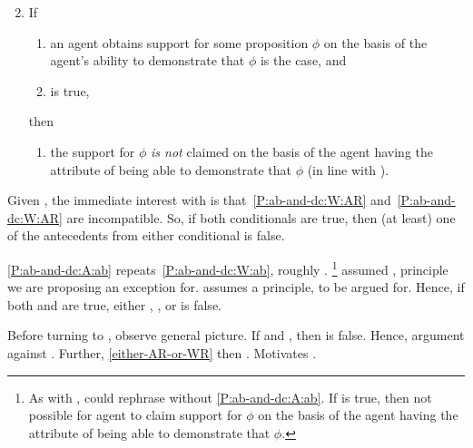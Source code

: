 \begin{note}[Conditional B]
  \begin{proposition}[\mcB{}]
    \begin{enumerate}[label=(C\Alph*), ref=(C\Alph*)]
      \setcounter{enumi}{1}
    \item\label{P:ab-and-dc:A} If
      \begin{enumerate}[label=(\roman*), ref=(CB.\roman*)]
      \item\label{P:ab-and-dc:A:ab} an agent obtains support for some proposition \(\phi\) on the basis of the agent's ability to demonstrate that \(\phi\) is the case, and
      \item\label{P:ab-and-dc:A:ni} \nI{} is true,
      \end{enumerate}
      then
      \begin{enumerate}[label=(\roman*), ref=(CB.\roman*), resume]
      \item\label{P:ab-and-dc:A:AR} the support for \(\phi\) \emph{is not} claimed on the basis of the agent having the attribute of being able to demonstrate that \(\phi\) (in line with \AR{}).
      \end{enumerate}
    \end{enumerate}
  \end{proposition}

  Given \mcA{}, the immediate interest with \mcB{} is that~\ref{P:ab-and-dc:W:AR} and~\ref{P:ab-and-dc:W:AR} are incompatible.
  So, if both conditionals are true, then (at least) one of the antecedents from either conditional is false.

  \ref{P:ab-and-dc:A:ab} repeats~\ref{P:ab-and-dc:W:ab}, roughly \eA{}.\nolinebreak
  \footnote{
    As with \mcA{}, could rephrase without \ref{P:ab-and-dc:A:ab}.
    If \nI{} is true, then not possible for agent to claim support for \(\phi\) on the basis of the agent having the attribute of being able to demonstrate that \(\phi\).
  }
  \mcA{} assumed \uRa{}, principle we are proposing an exception for.
  \mcB{} assumes a principle, \nI{} to be argued for.
  Hence, if both \mcA{} and \mcB{} are true, either \eA{}, \uRa{}, or \nI{} is false.

  Before turning to \nI{}, observe general picture.
  If \eA{} and \nI{}, then \uRa{} is false.
  Hence, argument against \uRa{}.
  Further, \ref{either-AR-or-WR} then \WR{}.
  Motivates \rC{}.
\end{note}



